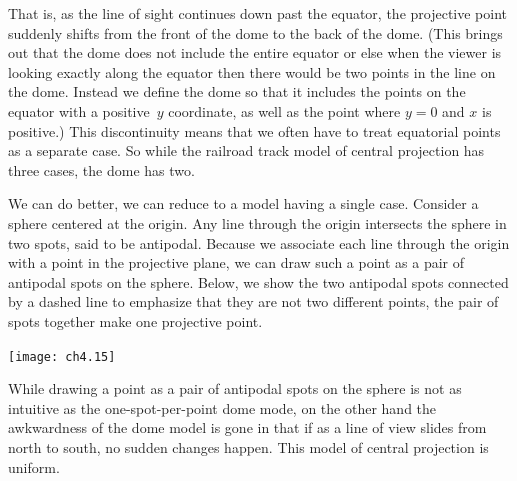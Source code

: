 That is, as
the line of sight continues down past the equator, the projective point
suddenly shifts from the front of the dome to the back of the dome.
(This brings out that the dome does not include the entire equator
or else
when the viewer is looking exactly along the equator then there would be 
two points in the line on the dome. 
Instead we define the dome so that it includes the
points on the equator with a positive~$y$ coordinate, as well as the point
where $y=0$ and $x$ is positive.)
This discontinuity means that
we often have to treat equatorial points as a separate case.
So while the railroad track model of central projection
has three cases, the dome has two.

We can do better, we can reduce to a model having a single case.
Consider a sphere centered at the origin.
Any line through the origin intersects the sphere in two spots, said to be
antipodal.
Because we associate each line through the origin 
with a point in the projective 
plane, we can draw such a point as a pair of antipodal spots on the sphere. 
Below, we show the two antipodal spots connected by a dashed line
to emphasize that they are not two 
different points, the pair of spots together make one projective point.
\begin{center}
  \texttt{[image: ch4.15]}
\end{center}
While drawing a point as a pair of antipodal 
spots on the sphere is not as intuitive as the one-spot-per-point dome mode,
on the other hand
the awkwardness of the dome model is gone in that if 
as a line of view slides from north to south, 
no sudden changes happen.
This model of central projection is uniform.

